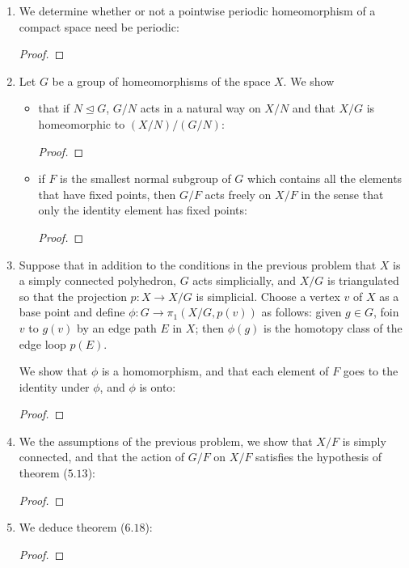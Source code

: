 \documentclass{book}
\begin{document}
\begin{enumerate}[(1)]
    \item We determine whether or not a pointwise periodic homeomorphism of a compact space need be periodic: 
        \begin{proof}
        \end{proof}

    \item Let $G$ be a group of homeomorphisms of the space $X$. We show 
        \begin{itemize}
            \item that if $N \trianglelefteq G$, $G/N$ acts in a natural way on $X/N$ and that $X/G$ is homeomorphic to $(X/N)/(G/N)$: 
                \begin{proof}
                \end{proof}

            \item if $F$ is the smallest normal subgroup of $G$ which contains all the elements that have fixed points, then $G/F$ acts freely on $X/F$ in the sense that only the identity element has fixed points: 
                \begin{proof}
                \end{proof}
        \end{itemize}

    \item Suppose that in addition to the conditions in the previous problem that $X$ is a simply connected polyhedron, $G$ acts simplicially, and $X/G$ is triangulated so that the projection $p: X \rightarrow X/G$ is simplicial. Choose a vertex $v$ of $X$ as a base point and define $\phi: G \rightarrow \pi_1(X/G, p(v))$ as follows: given $g \in G$, foin $v$ to $g(v)$ by an edge path $E$ in $X$; then $\phi(g)$ is the homotopy class of the edge loop $p(E)$. 
        \par We show that $\phi$ is a homomorphism, and that each element of $F$ goes to the identity under $\phi$, and $\phi$ is onto: 
        \begin{proof}
        \end{proof}

    \item We the assumptions of the previous problem, we show that $X/F$ is simply connected, and that the action of $G/F$ on $X/F$ satisfies the hypothesis of theorem ($5.13$): 
        \begin{proof}
        \end{proof}

    \item We deduce theorem ($6.18$): 
        \begin{proof}
        \end{proof}
\end{enumerate}
\end{document}
